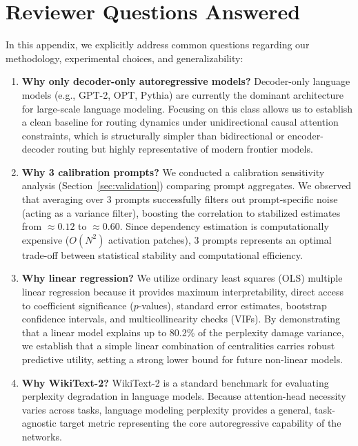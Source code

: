 \documentclass[11pt,a4paper]{article}
\theoremstyle{definition}
\theoremstyle{plain}
\begin{document}
\newpage
\appendix
\section{Reviewer Questions Answered}
\label{sec:appendix_faq}

In this appendix, we explicitly address common questions regarding our methodology, experimental choices, and generalizability:

\begin{enumerate}[leftmargin=*]
    \item \textbf{Why only decoder-only autoregressive models?}
    Decoder-only language models (e.g., GPT-2, OPT, Pythia) are currently the dominant architecture for large-scale language modeling. Focusing on this class allows us to establish a clean baseline for routing dynamics under unidirectional causal attention constraints, which is structurally simpler than bidirectional or encoder-decoder routing but highly representative of modern frontier models.
    
    \item \textbf{Why 3 calibration prompts?}
    We conducted a calibration sensitivity analysis (Section~\ref{sec:validation}) comparing prompt aggregates. We observed that averaging over 3 prompts successfully filters out prompt-specific noise (acting as a variance filter), boosting the correlation to stabilized estimates from $\approx 0.12$ to $\approx 0.60$. Since dependency estimation is computationally expensive ($O(N^2)$ activation patches), 3 prompts represents an optimal trade-off between statistical stability and computational efficiency.
    
    \item \textbf{Why linear regression?}
    We utilize ordinary least squares (OLS) multiple linear regression because it provides maximum interpretability, direct access to coefficient significance ($p$-values), standard error estimates, bootstrap confidence intervals, and multicollinearity checks (VIFs). By demonstrating that a linear model explains up to 80.2\% of the perplexity damage variance, we establish that a simple linear combination of centralities carries robust predictive utility, setting a strong lower bound for future non-linear models.
    
    \item \textbf{Why WikiText-2?}
    WikiText-2 is a standard benchmark for evaluating perplexity degradation in language models. Because attention-head necessity varies across tasks, language modeling perplexity provides a general, task-agnostic target metric representing the core autoregressive capability of the networks.
    

\end{enumerate}
\end{document}
